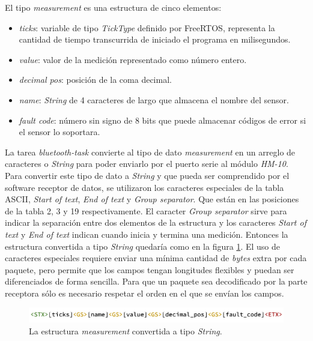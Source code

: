
El tipo \textit{measurement} es una estructura de cinco elementos:

\begin{itemize}
\item{\textit{ticks}:} variable de tipo \textit{TickType} definido por FreeRTOS, representa la cantidad de tiempo transcurrida de iniciado el programa en milisegundos.
\item{\textit{value}:} valor de la medición representado como número entero.
\item{\textit{decimal pos}:} posición de la coma decimal.
\item{\textit{name}:} \textit{String} de 4 caracteres de largo que almacena el nombre del sensor.
\item{\textit{fault code}:} número sin signo de 8 bits que puede almacenar códigos de error si el sensor lo soportara.
\end{itemize}

La tarea \textit{bluetooth-task} convierte al tipo de dato \textit{measurement} en un arreglo de caracteres o \textit{String} para poder enviarlo por el puerto serie al módulo \textit{HM-10}. Para convertir este tipo de dato a \textit{String} y que pueda ser comprendido por el software receptor de datos, se utilizaron los caracteres especiales de la tabla ASCII, \textit{Start of text}, \textit{End of text} y \textit{Group separator}. Que están en las posiciones de la tabla 2, 3 y 19 respectivamente. El caracter \textit{Group separator} sirve para indicar la separación entre dos elementos de la estructura y los caracteres \textit{Start of text} y \textit{End of text} indican cuando inicia y termina una medición. Entonces la estructura convertida a tipo \textit{String} quedaría como en la figura \ref{fig:measurement-string}. El uso de caracteres especiales requiere enviar una mínima cantidad de \textit{bytes} extra por cada paquete, pero permite que los campos tengan longitudes flexibles y puedan ser diferenciados de forma sencilla. Para que un paquete sea decodificado por la parte receptora sólo es necesario respetar el orden en el que se envían los campos.

\begin{figure}[htpb]
\centering
\includegraphics[width=.9\textwidth]{./Figures/measurement-string.png}
\caption{La estructura \textit{measurement} convertida a tipo \textit{String}.}
\label{fig:measurement-string}
\end{figure}



